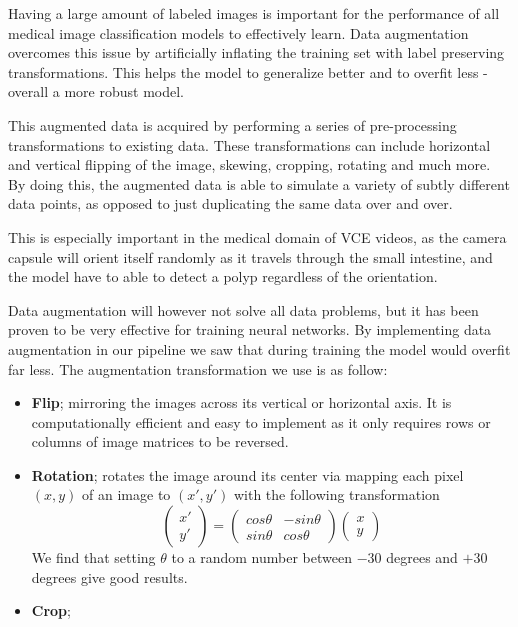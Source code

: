 \documentclass[thesis.tex]{subfiles}
\begin{document}
Having a large amount of labeled images is important for the performance of all medical image classification models to effectively learn. Data augmentation overcomes this issue by artificially inflating the training set with label preserving transformations. This helps the model to generalize better and to overfit less - overall a more robust model.

This augmented data is acquired by performing a series of pre-processing transformations to existing data. These transformations can include horizontal and vertical flipping of the image, skewing, cropping, rotating and much more. By doing this, the augmented data is able to simulate a variety of subtly different data points, as opposed to just duplicating the same data over and over.

This is especially important in the medical domain of VCE videos, as the camera capsule will orient itself randomly as it travels through the small intestine, and the model have to able to detect a polyp regardless of the orientation.

Data augmentation will however not solve all data problems, but it has been proven to be very effective for training neural networks. By implementing data augmentation in our pipeline we saw that during training the model would overfit far less. The augmentation transformation we use is as follow:

\begin{itemize}
\item \textbf{Flip}; mirroring the images across its vertical or horizontal axis. It is computationally efficient and easy to implement as it only requires rows or columns of image matrices to be reversed.
\item \textbf{Rotation}; rotates the image around its center via mapping each pixel $(x,y)$ of an image to $(x',y')$ with the following transformation
	\[ \begin{pmatrix} x' \\ y' \end{pmatrix} =
	\begin{pmatrix} cos \theta & -sin \theta \\ sin \theta & cos \theta \end{pmatrix}
	\begin{pmatrix} x \\ y \end{pmatrix} \]
We find that setting $\theta$ to a random number between $-30$ degrees and $+30$ degrees give good results.
\item \textbf{Crop}; 
	
\end{itemize}
\end{document}
